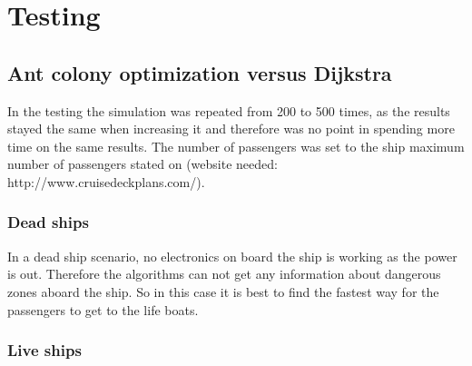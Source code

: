 \chapter{Testing}
\label{ch:testing}

\section{Ant colony optimization versus Dijkstra}
In the testing the simulation was repeated from 200 to 500 times, as the results stayed the same when increasing it and therefore was no point in spending more time on the same results. The number of passengers was set to the ship maximum number of passengers stated on (website needed: http://www.cruisedeckplans.com/).


\subsection{Dead ships}

In a dead ship scenario, no electronics on board the ship is working as the power is out. Therefore the algorithms can not get any information about dangerous zones aboard the ship. So in this case it is best to find the fastest way for the passengers to get to the life boats.

\subsection{Live ships}